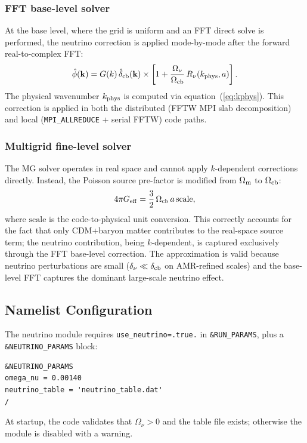 \documentclass[fleqn,usenatbib]{mnras}
\newcommand{\code}[1]{\texttt{#1}}
\newcommand{\Onu}{\Omega_\nu}
\newcommand{\Ocb}{\Omega_{\rm cb}}
\newcommand{\Om}{\Omega_{\rm m}}
\newcommand{\Rnu}{R_\nu}
\begin{document}
\subsubsection{FFT base-level solver}

At the base level, where the grid is uniform and an FFT direct solve
is performed, the neutrino correction is applied mode-by-mode after
the forward real-to-complex FFT:
\begin{equation}
\hat{\phi}(\mathbf{k}) = G(k)\,\hat{\delta}_{\rm cb}(\mathbf{k})
  \times \left[1 + \frac{\Onu}{\Ocb}\,\Rnu(k_{\rm phys},a)\right].
\label{eq:nu_fft}
\end{equation}
The physical wavenumber $k_{\rm phys}$ is computed via
equation~(\ref{eq:kphys}).  This correction is applied in both the
distributed (FFTW MPI slab decomposition) and local
(\code{MPI\_ALLREDUCE} + serial FFTW) code paths.

\subsubsection{Multigrid fine-level solver}

The MG solver operates in real space and cannot apply $k$-dependent
corrections directly.  Instead, the Poisson source pre-factor is
modified from $\Om$ to $\Ocb$:
\begin{equation}
4\pi G_{\rm eff} = \frac{3}{2}\,\Ocb\,a\,\mathrm{scale},
\label{eq:fourpi_nu}
\end{equation}
where $\mathrm{scale}$ is the code-to-physical unit conversion.  This
correctly accounts for the fact that only CDM+baryon matter contributes
to the real-space source term; the neutrino contribution, being
$k$-dependent, is captured exclusively through the FFT base-level
correction.  The approximation is valid because neutrino perturbations
are small ($\delta_\nu \ll \delta_{\rm cb}$ on AMR-refined scales) and
the base-level FFT captures the dominant large-scale neutrino effect.

\subsection{Namelist Configuration}

The neutrino module requires \code{use\_neutrino=.true.} in
\code{\&RUN\_PARAMS}, plus a \code{\&NEUTRINO\_PARAMS} block:
\begin{verbatim}
&NEUTRINO_PARAMS
omega_nu = 0.00140
neutrino_table = 'neutrino_table.dat'
/
\end{verbatim}
At startup, the code validates that $\Onu > 0$ and the table file
exists; otherwise the module is disabled with a warning.
\end{document}
